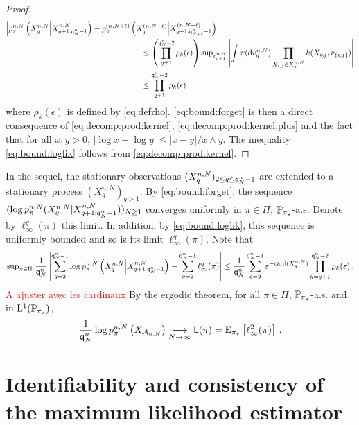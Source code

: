 \begin{proof}
\begin{align*}
\left|p_{\pi}^{n,N}\left(X_{q}^{n,N}\middle|X_{q+1:\ordermax{n}{N}-1}^{n,N}\right) -  p_{\pi}^{(n,N+\ell)}\left(X_{q}^{(n,N+\ell)}\middle|X_{q+1:\ordermax{n}{N+\ell}-1}^{(n,N+\ell)}\right) \right|&\\
&\hspace{-3.5cm}\leq \left(\prod_{q+1}^{\ordermax{n}{N}-2}\rho_k(\epsilon)\right) \sup_{v^{n,N}_{q+1}}\left|\int\pi(\rmd v^{n,N}_q)\prod_{X_{i,j}\in X_{q}^{n,N}}\condlik(X_{i,j},v_{\{i,j\}})\right|\\
&\hspace{-3.5cm}\le \prod_{q+1}^{\ordermax{n}{N}-2}\rho_k(\epsilon)\eqsp,
\end{align*}
where $\rho_k(\epsilon)$ is defined by \eqref{eq:defrho}. \eqref{eq:bound:forget} is then a direct consequence of \eqref{eq:decomp:prod:kernel}, \eqref{eq:decomp:prod:kernel:plus} and the fact that 
for all $x,y>0$, $|\log x - \log y| \le |x-y|/x\wedge y$.
The inequality \eqref{eq:bound:loglik} follows from \eqref{eq:decomp:prod:kernel}. 
\end{proof}
In the sequel, the stationary observations $(X^{n,N}_{q})_{2\le q\le {\mathsf{q}}^{n}_{N}-1}$ are extended to a stationary process $(X^{n,N}_{q})_{ q>1}$. By \eqref{eq:bound:forget}, the sequence $(\log p_{\pi}^{n,N}(X_{q}^{n,N}|X_{q+1:{\mathsf{q}}^{n}_{N}-1}^{n,N}))_{N\ge 1}$ converges uniformly in $\pi\in\Pi$, $\mathbb{P}_{\pi_{\star}}$-a.s. Denote by $\ell^q_{\infty}(\pi)$ this limit. In addition, by \eqref{eq:bound:loglik}, this sequence is uniformly bounded and so is its limit $\ell^q_{\infty}(\pi)$. Note that
\[
\mathrm{sup}_{\pi\in\Pi}\;\frac{1}{{\mathsf{q}}^{n}_{N}}\left|\sum_{q=2}^{{\mathsf{q}}^{n}_{N}-1}  \log p_{\pi}^{n,N}\left(X_{q}^{n,N}\middle|X_{q+1:{\mathsf{q}}^{n}_{N}-1}^{n,N}\right) - \sum_{q=2}^{{\mathsf{q}}^{n}_{N}-1}\ell^q_{\infty}(\pi)\right| \le \frac{1}{{\mathsf{q}}^{n}_{N}}\sum_{q=2}^{{\mathsf{q}}^{n}_{N}-1}\varepsilon^{-\mathrm{card}(X^{n,N}_{q})}\prod_{k=q+1}^{{\mathsf{q}}^{n}_{N}-2}\rho_k(\varepsilon)\,.
\]
\textcolor{red}{A ajuster avec les cardinaux}
By the ergodic theorem, for all $\pi\in\Pi$, $\mathbb{P}_{\pi_{\star}}$-a.s.  and in $\mathrm{L}^1(\mathbb{P}_{\pi_{\star}})$,
\[
\frac{1}{{\mathsf{q}}^{n}_{N}}\log p_{\pi}^{n,N}\left(X_{\mathcal{A}_{n,N}}\right) \underset{N\to \infty}{\longrightarrow} \mathsf{L}(\pi) = \mathbb{E}_{\pi_{\star}}\left[\ell^2_{\infty}(\pi)\right]\,.
\]

\section{Identifiability and consistency of the maximum likelihood estimator}

